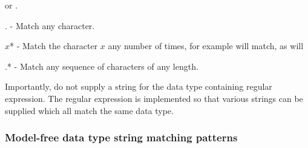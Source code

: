     or 
.

    . - Match any character.

    $x$* - Match the character $x$ any number of times, for example 
 will match, as will
    


    .* - Match any sequence of characters of any length.

Importantly, do not supply a string for the data type containing regular expression.  The
regular expression is implemented so that various strings can be supplied which all match
the same data type.


\subsubsection{Model-free data type string matching patterns}



